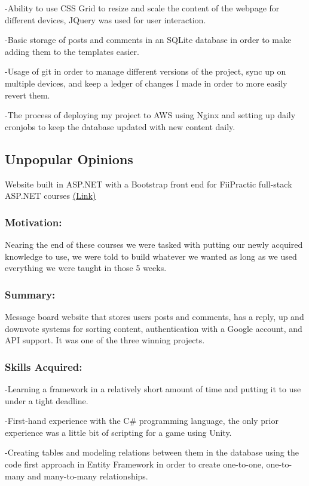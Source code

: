 \documentclass[a4paper,hidelinks,11pt]{article}
\begin{document}
-Ability to use CSS Grid to resize and scale the content of the webpage for different devices, JQuery was used
for user interaction.

-Basic storage of posts and comments in an SQLite database in order to make adding them to the templates easier.

-Usage of git in order to manage different versions of the project, sync up on multiple devices, and keep a
ledger of changes I made in order to more easily revert them.

-The process of deploying my project to AWS using Nginx and setting up daily cronjobs to keep the database updated with new
content daily.

\subsection{Unpopular Opinions}
Website built in ASP.NET with a Bootstrap front end for FiiPractic full-stack ASP.NET courses \href{https://github.com/IureaMarius/UnpopularOpinions}{(Link)}
\subsubsection{Motivation:}
Nearing the end of these courses we were tasked with putting our newly acquired knowledge to use, we were told
to build whatever we wanted as long as we used everything we were taught in those 5 weeks. 
\subsubsection{Summary:}
Message board website that stores users posts and comments, has a reply, up and downvote systems for sorting
content, authentication with a Google account, and API support. It was one of the three winning projects.
\subsubsection{Skills Acquired:}

-Learning a framework in a relatively short amount of time and putting it to use under a tight deadline.

-First-hand experience with the C\# programming language, the only prior experience was a little bit of 
scripting for a game using Unity.

-Creating tables and modeling relations between them in the database using the code first approach in Entity
Framework in order to create one-to-one, one-to-many and many-to-many relationships.
\end{document}
